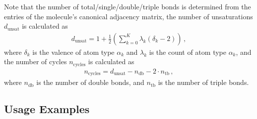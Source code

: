 \documentclass[a4paper,11pt]{article}
\begin{document}
Note that the number of total/single/double/triple bonds is determined from the entries of the molecule's canonical adjacency matrix, the number of unsaturations $d_\text{unsat}$ is calculated as
%
\begin{align}\label{eq:unsaturations}
    d_\text{unsat} = 1 + \frac{1}{2}\left(\sum\limits_{k=0}^{K}\lambda_k(\delta_k-2)\right) \, ,
\end{align}
%
where $\delta_k$ is the valence of atom type $\alpha_k$ and $\lambda_k$ is the count of atom type $\alpha_k$, and the number of cycles $n_\text{cycles}$ is calculated as
%
\begin{align}
  n_\text{cycles} = d_\text{unsat} - n_\text{db} - 2\cdot n_\text{tb} \, ,
\end{align}
%
where $n_\text{db}$ is the number of double bonds, and $n_\text{tb}$ is the number of triple bonds.

\subsection{Usage Examples}\label{sec:usage}
\end{document}
